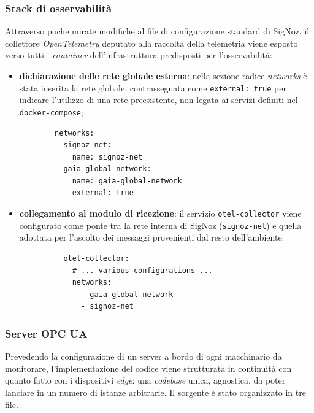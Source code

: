 \documentclass[12pt]{article}
\begin{document}
    \subsubsection{Stack di osservabilità}
    Attraverso poche mirate modifiche al file di configurazione standard di SigNoz, il collettore \textit{OpenTelemetry} deputato alla raccolta della telemetria viene esposto verso tutti i \textit{container} dell'infrastruttura predisposti per l'osservabilità:
    \begin{itemize}
        \item \textbf{dichiarazione delle rete globale esterna}: nella sezione radice \textit{networks} è stata inserita la rete globale, contrassegnata come \verb|external: true| per indicare l'utilizzo di una rete preesistente, non legata ai servizi definiti nel \verb|docker-compose|;
        \begin{verbatim}
        networks:
          signoz-net:
            name: signoz-net
          gaia-global-network:
            name: gaia-global-network
            external: true
        \end{verbatim}
        \item \textbf{collegamento al modulo di ricezione}: il servizio \verb|otel-collector| viene configurato come ponte tra la rete interna di SigNoz (\verb|signoz-net|) e quella adottata per l'ascolto dei messaggi provenienti dal resto dell'ambiente.
        \begin{verbatim}
          otel-collector:
            # ... various configurations ...
            networks:
              - gaia-global-network
              - signoz-net
        \end{verbatim}
    \end{itemize}
    
    \subsubsection{Server OPC UA}
    Prevedendo la configurazione di un server a bordo di ogni macchinario da monitorare, l'implementazione del codice viene strutturata in continuità con quanto fatto con i dispositivi \textit{edge}: una \textit{codebase} unica, agnostica, da poter lanciare in un numero di istanze arbitrarie.
    Il sorgente è stato organizzato in tre file.
\end{document}
